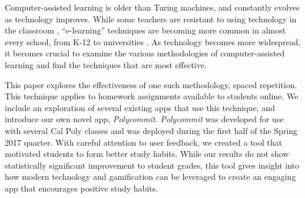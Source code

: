 \par Computer-assisted learning is older than Turing machines, and constantly evolves as technology improves. While some teachers are resistant to using technology in the classroom \cite{BJET:BJET12051}, ``e-learning'' techniques are becoming more common in almost every school, from K-12 to universities \cite{EJED:EJED12020}. As technology becomes more widespread, it becomes crucial to examine the various methodologies of computer-assisted learning and find the techniques that are most effective.

\par This paper explores the effectiveness of one such methodology, spaced repetition. This technique applies to homework assignments available to students online. We include an exploration of several existing apps that use this technique, and introduce our own novel app, \textit{Polycommit.} \textit{Polycommit} was developed for use with several Cal Poly classes and was deployed during the first half of the Spring 2017 quarter. With careful attention to user feedback, we created a tool that motivated students to form better study habits. While our results do not show statistically significant improvement to student grades, this tool gives insight into how modern technology and gamification can be leveraged to create an engaging app that encourages positive study habits.